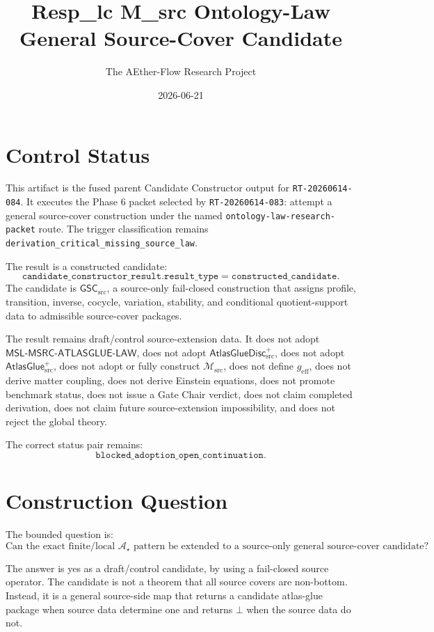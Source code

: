 \documentclass[11pt]{article}
\title{Resp\_lc M\_src Ontology-Law General Source-Cover Candidate}
\author{The AEther-Flow Research Project}
\date{2026-06-21}
\newcommand{\Msrc}{\mathcal{M}_{\mathrm{src}}}
\newcommand{\geff}{g_{\mathrm{eff}}}
\newcommand{\AtlasGlue}{\mathsf{AtlasGlue}_{\mathrm{src}}^{+}}
\newcommand{\AtlasGlueDisc}{\mathsf{AtlasGlueDisc}_{\mathrm{src}}^{+}}
\newcommand{\MSL}{\mathsf{MSL}\mbox{-}\mathsf{MSRC}\mbox{-}\mathsf{ATLASGLUE}\mbox{-}\mathsf{LAW}}
\newcommand{\GSC}{\mathsf{GSC}_{\mathrm{src}}}
\newcommand{\Astar}{\mathcal A_{\star}}
\newcommand{\Bot}{\bot}
\begin{document}
\maketitle

\section*{Control Status}

This artifact is the fused parent Candidate Constructor output for
\texttt{RT-20260614-084}. It executes the Phase 6 packet selected by
\texttt{RT-20260614-083}: attempt a general source-cover construction under
the named \texttt{ontology-law-research-packet} route. The trigger
classification remains \texttt{derivation\_critical\_missing\_source\_law}.

The result is a constructed candidate:
\[
  \texttt{candidate\_constructor\_result.result\_type}
  = \texttt{constructed\_candidate}.
\]
The candidate is \(\GSC\), a source-only fail-closed construction that assigns
profile, transition, inverse, cocycle, variation, stability, and conditional
quotient-support data to admissible source-cover packages.

The result remains draft/control source-extension data. It does not adopt
\(\MSL\), does not adopt \(\AtlasGlueDisc\), does not adopt \(\AtlasGlue\),
does not adopt or fully construct \(\Msrc\), does not define \(\geff\), does
not derive matter coupling, does not derive Einstein equations, does not
promote benchmark status, does not issue a Gate Chair verdict, does not claim
completed derivation, does not claim future source-extension impossibility,
and does not reject the global theory.

The correct status pair remains:
\[
  \texttt{blocked\_adoption\_open\_continuation}.
\]

\section{Construction Question}

The bounded question is:
\[
\text{Can the exact finite/local }\Astar\text{ pattern be extended to a
source-only general source-cover candidate?}
\]

The answer is yes as a draft/control candidate, by using a fail-closed source
operator. The candidate is not a theorem that all source covers are non-bottom.
Instead, it is a general source-side map that returns a candidate atlas-glue
package when source data determine one and returns \(\Bot\) when the source
data do not.
\end{document}
